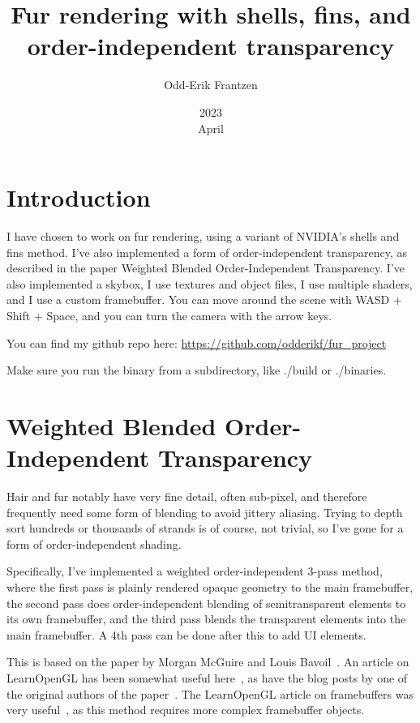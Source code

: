 \documentclass[a4paper, 12pt]{article}
\title{Fur rendering with shells, fins, and order-independent transparency}
\date{2023\\ April}
\author{Odd-Erik Frantzen}
\begin{document}
    \maketitle
    \section{Introduction}
    I have chosen to work on fur rendering,
    using a variant of NVIDIA's shells and fins method.
    I've also implemented a form of order-independent transparency,
    as described in the paper Weighted Blended Order-Independent Transparency.
    I've also implemented a skybox, I use textures and object files, I use multiple shaders,
    and I use a custom framebuffer.
    You can move around the scene with WASD + Shift + Space,
    and you can turn the camera with the arrow keys.

    You can find my github repo here: \url{https://github.com/odderikf/fur_project}

    Make sure you run the binary from a subdirectory, like ./build or ./binaries.

    \section{Weighted Blended Order-Independent Transparency}

    Hair and fur notably have very fine detail, often sub-pixel,
    and therefore frequently need some form of blending to avoid jittery aliasing.
    Trying to depth sort hundreds or thousands of strands is of course, not trivial,
    so I've gone for a form of order-independent shading.

    Specifically, I've implemented a weighted order-independent 3-pass method,
    where the first pass is plainly rendered opaque geometry to the main framebuffer,
    the second pass does order-independent blending of semitransparent elements
    to its own framebuffer,
    and the third pass blends the transparent elements into the main framebuffer.
    A 4th pass can be done after this to add UI elements.

    This is based on the paper by Morgan McGuire and Louis Bavoil~\cite{McGuire2013Transparency}.
    An article on LearnOpenGL has been somewhat useful here~\cite{learnblended},
    as have the blog posts by one of the original authors of the paper~\cite{blendedblog1,blendedblog2,blendedblog3}.
    The LearnOpenGL article on framebuffers was very useful~\cite{learnframebuffers},
    as this method requires more complex framebuffer objects.
\end{document}
